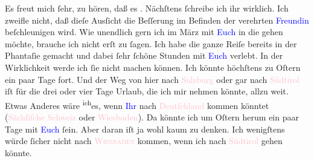 \pstart
           Es freut mich ſehr, zu hören, daß es \label{K_L03198-2v}\label{K_L03198-2h}. Nächſtens ſchreibe ich ihr wirklich. Ich zweifle nicht, daß dieſe Ausſicht
               die Beſſerung im Befinden der verehrten \textcolor{blue}{Freundin}{}\ledrightnote{{$\rightarrow$}\textcolor{blue}{Olga Schnitzler}} beſchleunigen wird. Wie unendlich gern ich im März mit \textcolor{blue}{Euch}{}\ledrightnote{{$\rightarrow$}\textcolor{blue}{Olga Schnitzler}} in die \label{K_L03198-3v}\label{K_L03198-3h} gehen möchte,
               brauche ich nicht erſt zu ſagen. Ich habe die ganze Reiſe bereits in der Phantaſie
               gemacht und dabei ſehr ſchöne Stunden mit \textcolor{blue}{Euch}{}\ledrightnote{{$\rightarrow$}\textcolor{blue}{Olga Schnitzler}} verlebt. In der Wirklichkeit werde ich ſie nicht machen
               können. Ich könnte höchſtens zu Oſtern ein paar Tage fort. Und der Weg von hier nach
                  \textcolor{pink}{Salzburg}{}\ledrightnote{\textcolor{pink}{Salzburg}} oder gar {\pb}nach \textcolor{pink}{Südtirol}{}\ledrightnote{\textcolor{pink}{Südtirol}}
               iſt für die drei oder vier Tage Urlaub, die ich mir nehmen könnte, allzu weit. Etwas
               Anderes wäre \substVorne{}\textsuperscript{ich}\substDazwischen{}es\substHinten{}, wenn \textcolor{blue}{Ihr}{}\ledrightnote{{$\rightarrow$}\textcolor{blue}{Olga Schnitzler}} nach \textcolor{pink}{Deutſchland}{}\ledrightnote{\textcolor{pink}{Deutschland}} kommen könntet (\textcolor{pink}{Sächſiſche Schweiz}{}\ledrightnote{\textcolor{pink}{Sächsische Schweiz}}\strikeout{,} oder \textcolor{pink}{Wiesbaden}{}\ledrightnote{\textcolor{pink}{Wiesbaden}}). Da könnte ich um Oſtern herum ein paar Tage mit \textcolor{blue}{Euch}{}\ledrightnote{\textcolor{blue}{Olga Schnitzler}} ſein. Aber daran iſt ja wohl kaum zu denken. Ich
               wenigſtens würde ſicher nicht nach \textsc{\textcolor{pink}{Wiesbaden}{}\ledrightnote{\textcolor{pink}{Wiesbaden}}} kommen, wenn ich nach \textcolor{pink}{Südtirol}{}\ledrightnote{\textcolor{pink}{Südtirol}} gehen
               könnte.\pend
           
